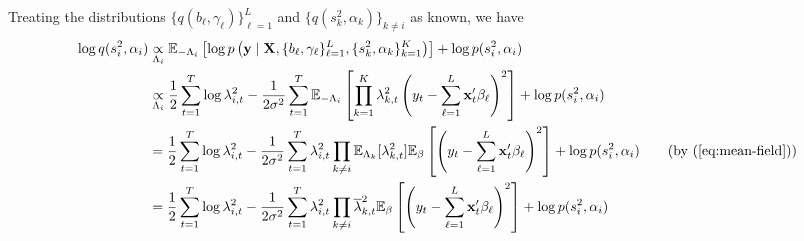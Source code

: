\documentclass{article}
\newcommand{\E}{\mathbb{E}}
\begin{document}
\begin{itemize}
Treating the distributions $\{q(b_\ell,\gamma_\ell)\}_{\ell=1}^L$ and $\{q(s^2_k,\alpha_k)\}_{k \neq i}$ as known, we have 
\begin{align*}
    \log q(s_i^2,\alpha_i) &\underset{\Lambda_i}{\propto} \E_{-\Lambda_i} \left[\log p\left(\mathbf{y} \;|\; \mathbf{X}, \{b_\ell,\gamma_\ell\}_{\ell=1}^L, \{s^2_k,\alpha_k\}_{k=1}^K\right)\right] + \log p(s_i^2,\alpha_i) \\
    &\underset{\Lambda_i}{\propto} \frac{1}{2}\sum_{t=1}^T \log \lambda^2_{i,t} - \frac{1}{2\sigma^2}\sum_{t=1}^T\E_{-\Lambda_i}\left[\prod_{k=1}^K \lambda^2_{k,t}\left(y_t - \sum_{\ell=1}^L \mathbf{x}'_t\beta_\ell\right)^2\right] + \log p(s_i^2,\alpha_i) \\
    &= \frac{1}{2}\sum_{t=1}^T \log \lambda^2_{i,t} - \frac{1}{2\sigma^2} \sum_{t=1}^T\lambda_{i,t}^2\prod_{k\neq i} \E_{\Lambda_k}[\lambda^2_{k,t}]\E_\beta\left[\left(y_t - \sum_{\ell=1}^L \mathbf{x}'_t\beta_\ell\right)^2\right]  + \log p(s_i^2,\alpha_i) \tag{by (\ref{eq:mean-field})} \\
    &= \frac{1}{2}\sum_{t=1}^T \log \lambda^2_{i,t} - \frac{1}{2\sigma^2} \sum_{t=1}^T\lambda_{i,t}^2\prod_{k\neq i} \overline{\lambda}_{k,t}^2\E_\beta\left[\left(y_t - \sum_{\ell=1}^L \mathbf{x}'_t\beta_\ell\right)^2\right]  + \log p(s_i^2,\alpha_i) 
\end{align*}


\end{itemize}
\end{document}
